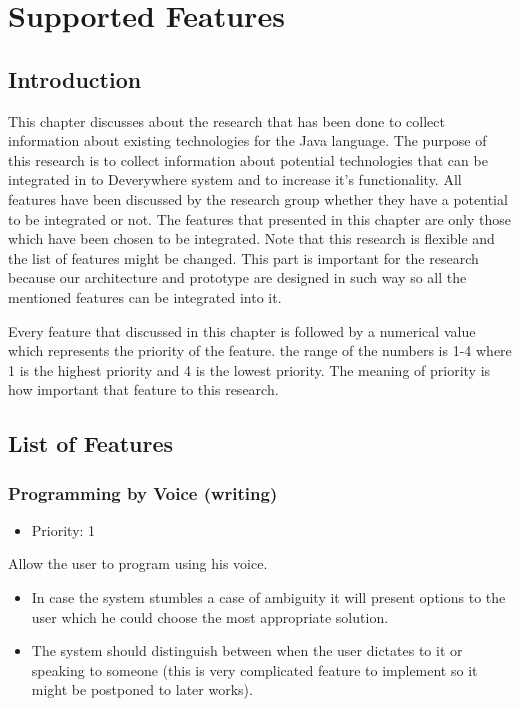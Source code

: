 \chapter{Supported Features} \label{chapter: Supported Features}
\section{Introduction}
This chapter discusses about the research that has been done to collect information about existing technologies for the Java language. The purpose of this research is to collect information about potential technologies that can be integrated in to Deverywhere system and to increase it's functionality. All features have been discussed by the research group whether they have a potential to be integrated or not. The features that presented in this chapter are only those which have been chosen to be integrated. Note that this research is flexible and the list of features might be changed. This part is important for the research because our architecture and prototype are designed in such way so all the mentioned features can be integrated into it.

Every feature that discussed in this chapter is followed by a numerical value which represents the priority of the feature. the range of the numbers is 1-4 where 1 is the highest priority and 4 is the lowest priority. The meaning of priority is how important that feature to this research.

\section{List of Features}
\subsection{Programming by Voice (writing)}
\begin{itemize}
	\item Priority: 1
\end{itemize}
Allow the user to program using his voice.
\begin{itemize}
	\item In case the system stumbles a case of ambiguity it will present options to the user which he could choose the most appropriate solution.
	\item The system should distinguish between when the user dictates to it or speaking to someone (this is very complicated feature to implement so it might be postponed to later works).
\end{itemize}
